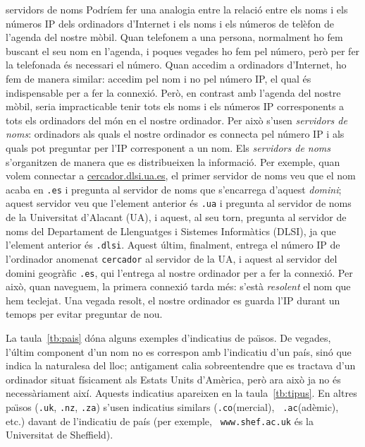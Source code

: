 \begin{persabermes}{servidors de noms}
  Podríem fer una analogia entre la relació entre els noms i els
  números IP dels ordinadors d'Internet i els noms i els números de
  telèfon de l'agenda del nostre mòbil. Quan telefonem a una persona,
  normalment ho fem buscant el seu nom en l'agenda, i poques vegades
  ho fem pel número, però per fer la telefonada és necessari el
  número. Quan accedim a ordinadors d'Internet, ho fem de manera
  similar: accedim pel nom i no pel número IP, el qual és
  indispensable per a fer la connexió. Però, en contrast amb l'agenda
  del nostre mòbil, seria impracticable tenir tots els noms i els
  números IP corresponents a tots els ordinadors del món en el nostre
  ordinador. Per això s'usen \emph{servidors de noms}: ordinadors als
  quals el nostre ordinador es connecta pel número IP i als quals pot
  preguntar per l'IP corresponent a un nom. Els \emph{servidors de
    noms} s'organitzen de manera que es distribueixen la
  informació. Per exemple, quan volem connectar a
  \url{cercador.dlsi.ua.es}, el primer servidor de noms veu que el nom
  acaba en \texttt{.es} i pregunta al servidor de noms que s'encarrega
  d'aquest \emph{domini}; aquest servidor veu que l'element anterior
  és \texttt{.ua} i pregunta al servidor de noms de la Universitat
  d'Alacant (UA), i aquest, al seu torn, pregunta al servidor de noms
  del Departament de Llenguatges i Sistemes Informàtics (DLSI), ja que
  l'element anterior és \texttt{.dlsi}. Aquest últim, finalment,
  entrega el número IP de l'ordinador anomenat \texttt{cercador} al
  servidor de la UA, i aquest al servidor del domini geogràfic
  \texttt{.es}, qui l'entrega al nostre ordinador per a fer la
  connexió. Per això, quan naveguem, la primera connexió tarda més:
  s'està \emph{resolent} el nom que hem teclejat. Una vegada resolt,
  el nostre ordinador es guarda l'IP durant un temops per evitar
  preguntar de nou.
\end{persabermes}

La taula~\ref{tb:pais} dóna alguns exemples d'indicatius de
pa\"{\i}sos. De vegades, l'últim component d'un nom no es correspon
amb l'indicatiu d'un país, sinó que indica la naturalesa del lloc;
antigament calia sobreentendre que es tractava d'un ordinador situat
físicament als Estats Units d'Amèrica, però ara això ja no és
necessàriament així. Aquests indicatius apareixen en la
taula~\ref{tb:tipus}. En altres pa\"{\i}sos ({\tt .uk}, {\tt .nz},
{\tt .za}) s'usen indicatius similars ({\tt .co}(mercial), {\tt
  .ac}(adèmic), etc.) davant de l'indicatiu de país (per exemple, {\tt
  www.shef.ac.uk} és la Universitat de Sheffield).

